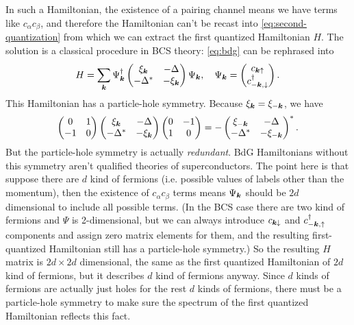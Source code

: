 \documentclass[hyperref, a4paper]{article}
\begin{document}
In such a Hamiltonian, the existence of a pairing channel means we have terms like $c_\alpha c_\beta$,
and therefore the Hamiltonian can't be recast into \eqref{eq:second-quantization} from which we can extract 
the first quantized Hamiltonian $H$. The solution is a classical procedure in BCS theory: \eqref{eq:bdg} can be rephrased into 
\begin{equation}
    H = \sum_{\vb*{k}} \Psi_{\vb*{k}}^\dagger \pmqty{ \xi_{\vb*{k}} & - \Delta \\ - \Delta^* & -\xi_{\vb*{k}} } \Psi_{\vb*{k}}, \quad \Psi_{\vb*{k}} = \pmqty{c_{\vb*{k} \uparrow} \\ c^\dagger_{- \vb*{k}, \downarrow}}.
\end{equation}
This Hamiltonian has a particle-hole symmetry. Because $\xi_{\vb*{k}} = \xi_{- \vb*{k}}$, we have 
\begin{equation}
    \pmqty{0 & 1 \\ -1 & 0} \pmqty{\xi_{\vb*{k}} & - \Delta \\ - \Delta^* & - \xi_{\vb*{k}}} \pmqty{0 & -1 \\ 1 & 0} = - \pmqty{\xi_{- \vb*{k}} & - \Delta \\ - \Delta^* & - \xi_{- \vb*{k}}}^*.
\end{equation}
But the particle-hole symmetry is actually \emph{redundant}. BdG Hamiltonians without this symmetry aren't 
qualified theories of superconductors. The point here is that suppose there are $d$ kind of fermions (i.e. 
possible values of labels other than the momentum), then the existence of $c_\alpha c_\beta$ terms means 
$\Psi_{\vb*{k}}$ should be $2d$ dimensional to include all possible terms. (In the BCS case there are two 
kind of fermions and $\Psi$ is 2-dimensional, but we can always introduce $c_{\vb*{k} \downarrow}$ and 
$c^\dagger_{- \vb*{k}, \uparrow}$ components and assign zero matrix elements for them, and the resulting 
first-quantized Hamiltonian still has a particle-hole symmetry.) So the resulting $H$ matrix 
is $2d \times 2d$ dimensional, the same as the first quantized Hamiltonian of $2d$ kind of fermions,
but it describes $d$ kind of fermions anyway.
Since $d$ kinds of fermions are actually just holes for the rest $d$ kinds of fermions, 
there must be a particle-hole symmetry to make sure the spectrum of the first quantized Hamiltonian 
reflects this fact.
\end{document}
